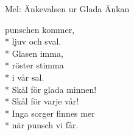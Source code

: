 \begin{SongText}
    \begin{SongInfo}
        Mel: Änkevalsen ur Glada Änkan
    \end{SongInfo}
    \begin{SongVerse}
        punschen kommer,\\*%
        ljuv och sval.\\*%
        Glasen imma,\\*%
        röster stimma\\*%
        i vår sal.\\*%
        Skål för glada minnen!\\*%
        Skål för varje vår!\\*%
        Inga sorger finnes mer\\*%
        när punsch vi får.
    \end{SongVerse}
\end{SongText}